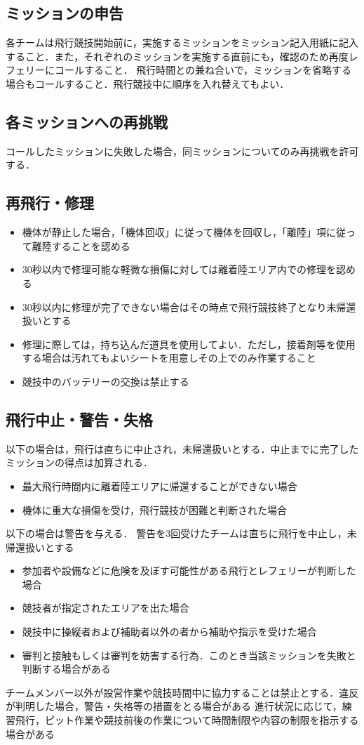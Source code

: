 \documentclass[a4paper,12pt,oneside]{jsarticle}
\begin{document}
\subsection{ミッションの申告}
各チームは飛行競技開始前に，実施するミッションをミッション記入用紙に記入すること．また，それぞれのミッションを実施する直前にも，確認のため再度レフェリーにコールすること．
飛行時間との兼ね合いで，ミッションを省略する場合もコールすること．飛行競技中に順序を入れ替えてもよい．

\subsection{各ミッションへの再挑戦}
コールしたミッションに失敗した場合，同ミッションについてのみ再挑戦を許可する．

\subsection{再飛行・修理}
\begin{itemize}
  \item 機体が静止した場合，「機体回収」に従って機体を回収し，「離陸」項に従って離陸することを認める
  \item 30秒以内で修理可能な軽微な損傷に対しては離着陸エリア内での修理を認める
  \item 30秒以内に修理が完了できない場合はその時点で飛行競技終了となり未帰還扱いとする
  \item 修理に際しては，持ち込んだ道具を使用してよい．ただし，接着剤等を使用する場合は汚れてもよいシートを用意しその上でのみ作業すること
  \item 競技中のバッテリーの交換は禁止する
\end{itemize}

\subsection{飛行中止・警告・失格}
以下の場合は，飛行は直ちに中止され，未帰還扱いとする．中止までに完了したミッションの得点は加算される．
\begin{itemize}
  \item 最大飛行時間内に離着陸エリアに帰還することができない場合
  \item 機体に重大な損傷を受け，飛行競技が困難と判断された場合
\end{itemize}
以下の場合は警告を与える．
警告を3回受けたチームは直ちに飛行を中止し，未帰還扱いとする
\begin{itemize}
  \item 参加者や設備などに危険を及ぼす可能性がある飛行とレフェリーが判断した場合
  \item 競技者が指定されたエリアを出た場合
  \item 競技中に操縦者および補助者以外の者から補助や指示を受けた場合
  \item 審判と接触もしくは審判を妨害する行為．このとき当該ミッションを失敗と判断する場合がある
\end{itemize}
チームメンバー以外が設営作業や競技時間中に協力することは禁止とする．違反が判明した場合，警告・失格等の措置をとる場合がある
進行状況に応じて，練習飛行，ピット作業や競技前後の作業について時間制限や内容の制限を指示する場合がある
\end{document}
